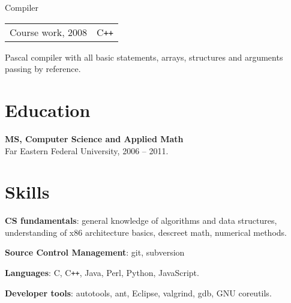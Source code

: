 \documentclass[a4paper]{article}
\begin{document}
\begin{multicols}{2}


		\begin{project}{Compiler}{\begin{tabular}{@{}l|l}Course work, 2008 & C\texttt{++}\\\end{tabular}}
			Pascal compiler with all basic statements, arrays, structures and arguments passing by reference.
		\end{project}
	\end{multicols}

	\section{Education}
	\begin{items}
		\item \textbf{MS, Computer Science and Applied Math}\\
		Far Eastern Federal University, 2006 -- 2011.
	\end{items}

	\section{Skills}
	\begin{multicols}{2}
		\raggedcolumns
		\begin{items}
			\item \textbf{CS fundamentals}: general knowledge of algorithms and data structures, understanding of x86 architecture basics, descreet math, numerical methods.
			\item \textbf{Source Control Management}: git, subversion
			\columnbreak
			\item \textbf{Languages}: C, C\texttt{++}, Java, Perl, Python, JavaScript.
			\item \textbf{Developer tools}: autotools, ant, Eclipse, valgrind, gdb, GNU coreutils.
		\end{items}
	\end{multicols}
\end{document}
